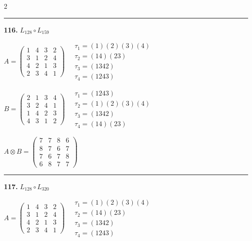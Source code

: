 \begin{multicols}{2}
\vspace{0.3em}
\hrule
\vspace{0.3em}

\noindent\textbf{116.} $L_{128} \circ L_{159}$

$A = \begin{pmatrix} 1 & 4 & 3 & 2 \\ 3 & 1 & 2 & 4 \\ 4 & 2 & 1 & 3 \\ 2 & 3 & 4 & 1 \end{pmatrix} \quad \begin{matrix} \tau_{1}=(1)(2)(3)(4) \\ \tau_{2}=(1 4)(2 3) \\ \tau_{3}=(1 3 4 2) \\ \tau_{4}=(1 2 4 3) \end{matrix}$

$B = \begin{pmatrix} 2 & 1 & 3 & 4 \\ 3 & 2 & 4 & 1 \\ 1 & 4 & 2 & 3 \\ 4 & 3 & 1 & 2 \end{pmatrix} \quad \begin{matrix} \tau_{1}=(1 2 4 3) \\ \tau_{2}=(1)(2)(3)(4) \\ \tau_{3}=(1 3 4 2) \\ \tau_{4}=(1 4)(2 3) \end{matrix}$

$A \otimes B = \begin{pmatrix} 7 & 7 & 8 & 6 \\ 8 & 7 & 6 & 7 \\ 7 & 6 & 7 & 8 \\ 6 & 8 & 7 & 7 \end{pmatrix}$

\vspace{0.3em}
\hrule
\vspace{0.3em}

\noindent\textbf{117.} $L_{128} \circ L_{320}$

$A = \begin{pmatrix} 1 & 4 & 3 & 2 \\ 3 & 1 & 2 & 4 \\ 4 & 2 & 1 & 3 \\ 2 & 3 & 4 & 1 \end{pmatrix} \quad \begin{matrix} \tau_{1}=(1)(2)(3)(4) \\ \tau_{2}=(1 4)(2 3) \\ \tau_{3}=(1 3 4 2) \\ \tau_{4}=(1 2 4 3) \end{matrix}$


\end{multicols}
